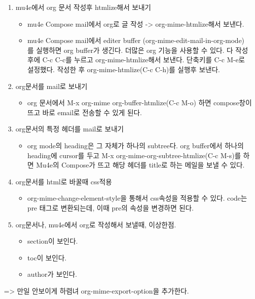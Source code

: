 \documentclass[11pt]{article}
\begin{document}
\begin{enumerate}
\item mu4e에서 org 문서 작성후 htmlize해서 보내기
\begin{itemize}
\item mu4e Compose mail에서 org로 글 작성 -> org-mime-htmlize해서 보낸다.
\item mu4e Compose mail에서 editer buffer
(org-mime-edit-mail-in-org-mode) 를 실행하면 org buffer가
생긴다. 더많은 org 기능을 사용할 수 있다. 다 작성후에 C-c C-c를
누르고 org-mime-htmlize해서 보낸다. 단축키를 C-c M-e로
설정했다. 작성한 후 org-mime-htmlize(C-c C-h)를 실행후 보낸다.
\end{itemize}

\item org문서를 mail로 보내기
\begin{itemize}
\item org 문서에서 M-x org-mime org-buffer-htmlize(C-c M-o) 하면
compose창이 뜨고 바로 email로 전송할 수 있게 된다.
\end{itemize}

\item org문서의 특정 헤더를 mail로 보내기 
\begin{itemize}
\item org mode의 heading은 그 자체가 하나의 subtree다. org buffer에서
하나의 heading에 cursor를 두고 M-x
org-mime-org-subtree-htmlize(C-c M-s)를 하면 Mu4e의 Compose가
뜨고 해당 헤더를 title로 하는 메일을 보낼 수 있다.
\end{itemize}

\item org문서를 html로 바꿀때 css적용
\begin{itemize}
\item org-mime-change-element-style을 통해서 css속성을 적용할 수
있다. code는 pre 태그로 변환되는데, 이때 pre의 속성을 변경하면
된다.
\end{itemize}

\item org문서나, mu4e에서 org로 작성해서 보낼때, 이상한점.
\begin{itemize}
\item section이 보인다.
\item toc이 보인다.
\item author가 보인다.
\end{itemize}
\end{enumerate}
=> 만일 안보이게 하렴녀 org-mime-export-option을 추가한다.
\end{document}
